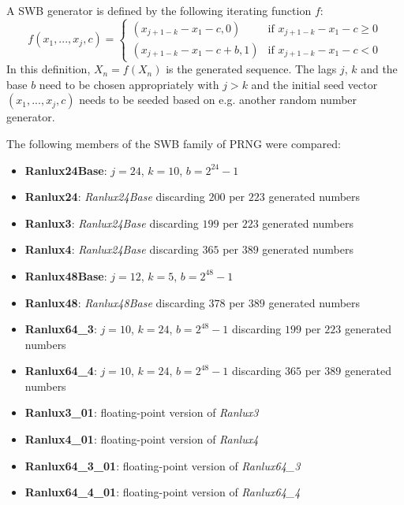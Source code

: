     A SWB generator is defined by the following iterating function $f$:
    \begin{equation*}
        f\left(x_1, ..., x_j, c\right) = \begin{cases}
                                             \left(x_{j + 1 - k} - x_1 - c, 0\right)     & \text{if } x_{j + 1 - k} - x_1 - c \geq 0 \\
                                             \left(x_{j + 1 - k} - x_1 - c + b, 1\right) & \text{if } x_{j + 1 - k} - x_1 - c < 0
                                         \end{cases}
    \end{equation*}
    In this definition, $X_n = f\left(X_n\right)$ is the generated sequence. The lags $j$, $k$ and the base $b$ need to be chosen appropriately with $j > k$ and the initial seed vector $\left(x_1, ..., x_j, c\right)$ needs to be seeded based on e.g. another random number generator.

    The following members of the SWB family of PRNG were compared:
    \begin{itemize}
        \itemsep0em
        \item \textbf{Ranlux24Base}:    $j = 24$, $k = 10$, $b = 2^{24} - 1$
        \item \textbf{Ranlux24}:        \textit{Ranlux24Base} discarding $200$ per $223$ generated numbers
        \item \textbf{Ranlux3}:         \textit{Ranlux24Base} discarding $199$ per $223$ generated numbers
        \item \textbf{Ranlux4}:         \textit{Ranlux24Base} discarding $365$ per $389$ generated numbers
        \item \textbf{Ranlux48Base}:    $j = 12$, $k = 5$, $b = 2^{48} - 1$
        \item \textbf{Ranlux48}:        \textit{Ranlux48Base} discarding $378$ per $389$ generated numbers
        \item \textbf{Ranlux64\_3}:     $j = 10$, $k = 24$, $b = 2^{48} - 1$ discarding $199$ per $223$ generated numbers
        \item \textbf{Ranlux64\_4}:     $j = 10$, $k = 24$, $b = 2^{48} - 1$ discarding $365$ per $389$ generated numbers
        \item \textbf{Ranlux3\_01}:     floating-point version of \textit{Ranlux3}
        \item \textbf{Ranlux4\_01}:     floating-point version of \textit{Ranlux4}
        \item \textbf{Ranlux64\_3\_01}: floating-point version of \textit{Ranlux64\_3}
        \item \textbf{Ranlux64\_4\_01}: floating-point version of \textit{Ranlux64\_4}
    \end{itemize}

